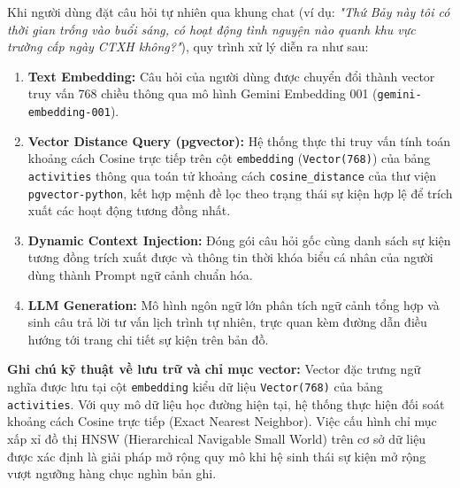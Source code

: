 Khi người dùng đặt câu hỏi tự nhiên qua khung chat (ví dụ: \textit{"Thứ Bảy này tôi có thời gian trống vào buổi sáng, có hoạt động tình nguyện nào quanh khu vực trường cấp ngày CTXH không?"}), quy trình xử lý diễn ra như sau:
\begin{enumerate}
    \item \textbf{Text Embedding:} Câu hỏi của người dùng được chuyển đổi thành vector truy vấn 768 chiều thông qua mô hình Gemini Embedding 001 (\texttt{gemini-embedding-001}).
    \item \textbf{Vector Distance Query (pgvector):} Hệ thống thực thi truy vấn tính toán khoảng cách Cosine trực tiếp trên cột \texttt{embedding} (\texttt{Vector(768)}) của bảng \texttt{activities} thông qua toán tử khoảng cách \texttt{cosine\_distance} của thư viện \texttt{pgvector-python}, kết hợp mệnh đề lọc theo trạng thái sự kiện hợp lệ để trích xuất các hoạt động tương đồng nhất.
    \item \textbf{Dynamic Context Injection:} Đóng gói câu hỏi gốc cùng danh sách sự kiện tương đồng trích xuất được và thông tin thời khóa biểu cá nhân của người dùng thành Prompt ngữ cảnh chuẩn hóa.
    \item \textbf{LLM Generation:} Mô hình ngôn ngữ lớn phân tích ngữ cảnh tổng hợp và sinh câu trả lời tư vấn lịch trình tự nhiên, trực quan kèm đường dẫn điều hướng tới trang chi tiết sự kiện trên bản đồ.
\end{enumerate}

\textbf{Ghi chú kỹ thuật về lưu trữ và chỉ mục vector:} Vector đặc trưng ngữ nghĩa được lưu tại cột \texttt{embedding} kiểu dữ liệu \texttt{Vector(768)} của bảng \texttt{activities}. Với quy mô dữ liệu học đường hiện tại, hệ thống thực hiện đối soát khoảng cách Cosine trực tiếp (Exact Nearest Neighbor). Việc cấu hình chỉ mục xấp xỉ đồ thị HNSW (Hierarchical Navigable Small World) trên cơ sở dữ liệu được xác định là giải pháp mở rộng quy mô khi hệ sinh thái sự kiện mở rộng vượt ngưỡng hàng chục nghìn bản ghi.
